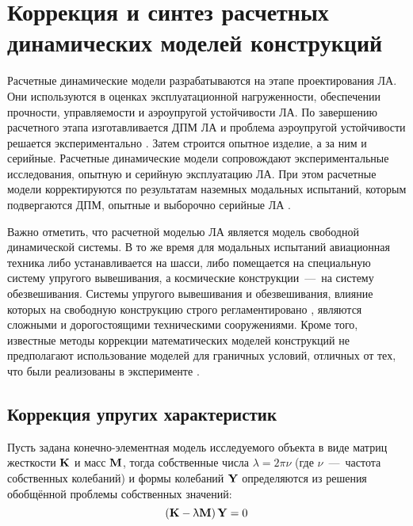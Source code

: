 \chapter{Коррекция и синтез расчетных динамических моделей конструкций}

Расчетные динамические модели разрабатываются на этапе проектирования ЛА. Они используются в оценках эксплуатационной нагруженности, обеспечении прочности, управляемости и аэроупругой устойчивости ЛА. По завершению расчетного этапа изготавливается ДПМ ЛА и проблема аэроупругой устойчивости решается экспериментально \cite{lib:modelUpdating:Karklje:GVT, lib:modelUpdating:Karklje:force}. Затем строится опытное изделие, а за ним и серийные. Расчетные динамические модели сопровождают экспериментальные исследования, опытную и серийную эксплуатацию ЛА. При этом расчетные модели корректируются по результатам наземных модальных испытаний, которым подвергаются ДПМ, опытные и выборочно серийные ЛА \cite{lib:modelUpdating:Karklje:GVT, lib:modelUpdating:Karklje:force, lib:modelUpdating:Heilen, lib:modelUpdating:Berns:monophase, lib:modelUpdating:Boswald, lib:modelUpdating:Brillhart, lib:modelUpdating:Peres, lib:modelUpdating:Peter, lib:modelUpdating:Pickrel, lib:modelUpdating:Baruch}.

Важно отметить, что расчетной моделью ЛА является модель свободной динамической системы. В то же время для модальных испытаний авиационная техника либо устанавливается на шасси, либо помещается на специальную систему упругого вывешивания, а космические конструкции~---~на систему обезвешивания. Системы упругого вывешивания и обезвешивания, влияние которых на свободную конструкцию строго регламентировано \cite{lib:modelUpdating:Berns:support}, являются сложными и дорогостоящими техническими сооружениями. Кроме того, известные методы коррекции математических моделей конструкций не предполагают использование моделей для граничных условий, отличных от тех, что были реализованы в эксперименте \cite{lib:modelUpdating:Mezhin, lib:modelUpdating:Kuznecov, lib:modelUpdating:Luo, lib:modelUpdating:Jang, lib:modelUpdating:Asgarieh, lib:modelUpdating:Sanayei, lib:modelUpdating:Wang}.

\section{Коррекция упругих характеристик} \label{struct:updating}

Пусть задана конечно-элементная модель исследуемого объекта в виде матриц жесткости $ \mathbf{K} $ и масс $ \mathbf{M} $, тогда собственные числа $ \lambda = 2 \pi \nu $ (где $ \nu $~---~частота собственных колебаний) и формы колебаний $ \mathbf{Y} $ определяются из решения обобщённой проблемы собственных значений:
\begin{equation}
	\left( \mathbf{K} - \uplambda \mathbf{M} \right) \mathbf{Y} = 0
\end{equation}

